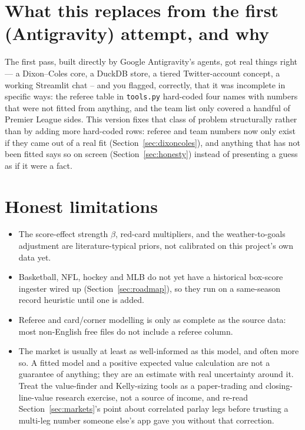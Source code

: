 \documentclass[11pt]{article}
\begin{document}
\section{What this replaces from the first (Antigravity) attempt, and why}
The first pass, built directly by Google Antigravity's agents, got real things right --- a
Dixon--Coles core, a DuckDB store, a tiered Twitter-account concept, a working Streamlit chat --
and you flagged, correctly, that it was incomplete in specific ways: the referee table in
\texttt{tools.py} hard-coded four names with numbers that were not fitted from anything, and the
team list only covered a handful of Premier League sides. This version fixes that class of problem
structurally rather than by adding more hard-coded rows: referee and team numbers now only exist
if they came out of a real fit (Section~\ref{sec:dixoncoles}), and anything that has not been
fitted says so on screen (Section~\ref{sec:honesty}) instead of presenting a guess as if it were
a fact.

\section{Honest limitations}
\begin{itemize}
\item The score-effect strength $\beta$, red-card multipliers, and the weather-to-goals adjustment
are literature-typical priors, not calibrated on this project's own data yet.
\item Basketball, NFL, hockey and MLB do not yet have a historical box-score ingester wired up
(Section~\ref{sec:roadmap}), so they run on a same-season record heuristic until one is added.
\item Referee and card/corner modelling is only as complete as the source data: most non-English
free files do not include a referee column.
\item The market is usually at least as well-informed as this model, and often more so. A fitted
model and a positive expected value calculation are not a guarantee of anything; they are an
estimate with real uncertainty around it. Treat the value-finder and Kelly-sizing tools as a
paper-trading and closing-line-value research exercise, not a source of income, and re-read
Section~\ref{sec:markets}'s point about correlated parlay legs before trusting a multi-leg number
someone else's app gave you without that correction.
\end{itemize}
\end{document}
